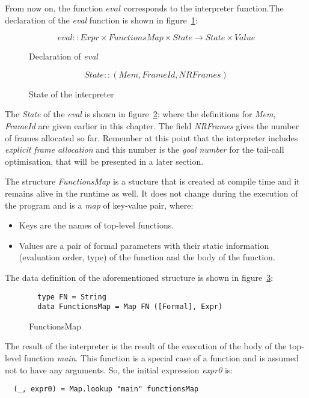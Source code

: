 \documentclass[diploma]{softlab-thesis}
\begin{document}
From now on, the function $\mathit{eval}$ corresponds to the interpreter function.The declaration of the \textit{eval} 
function is shown in figure~\ref{fig:eval}:

\begin{figure}[h]
  \[
    \mathit{eval} :: \mathit{Expr} \times \mathit{FunctionsMap} \times \mathit{State} \rightarrow 
    \mathit{State} \times \mathit{Value}
  \]
\caption{Declaration of \textit{eval}\label{fig:eval}}
\end{figure}

\begin{figure}[t]

\[
  \mathit{State :: (Mem, FrameId, NRFrames)}
\]

\caption{State of the interpreter\label{fig:state}}
\end{figure} 

The \textit{State} of the \textit{eval} is shown in figure~\ref{fig:state}:
where the definitions for \textit{Mem}, \textit{FrameId} are given earlier in this chapter. The field \textit{NRFrames}
gives the number of frames allocated so far. Remember at this point that the interpreter includes \textit{explicit frame 
allocation} and this number is the \textit{goal number} for the tail-call optimisation, that will be presented in a 
later section.

The structure \textit{FunctionsMap} is a stucture that is created at compile time and it remains alive in the runtime 
as well. It does not change during the execution of the program and is a \textit{map} of key-value pair, where:
\begin{itemize} 
  \item Keys are the names of top-level functions.
  \item Values are a pair of formal parameters with their static information (evaluation order, type) 
  of the function and the body of the function.
\end{itemize}

The data definition of the aforementioned structure is shown in figure~\ref{fig:functionsmap}:
\begin{figure}[h]
\begin{verbatim}
  type FN = String 
  data FunctionsMap = Map FN ([Formal], Expr)
\end{verbatim}
\caption{FunctionsMap\label{fig:functionsmap}}
\end{figure}
The result of the interpreter is the result of the execution of the body of the top-level function \textit{main}. 
This function is a special case of a function and is assumed not to have any arguments. So, the initial expression 
\textit{expr0} is: 
\begin{verbatim}
  (_, expr0) = Map.lookup "main" functionsMap
\end{verbatim}
\end{document}
